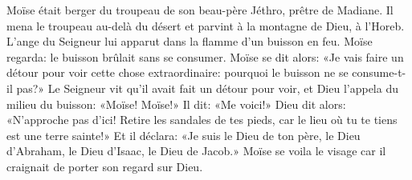 Moïse était berger du troupeau de son beau-père Jéthro, prêtre de Madiane.
Il mena le troupeau au-delà du désert
	et parvint à la montagne de Dieu, à l’Horeb.
L’ange du Seigneur lui apparut dans la flamme d’un buisson en feu.
	Moïse regarda: le buisson brûlait sans se consumer.
Moïse se dit alors:
	«Je vais faire un détour pour voir cette chose extraordinaire:
	pourquoi le buisson ne se consume-t-il pas?»
Le Seigneur vit qu’il avait fait un détour pour voir,
	et Dieu l’appela du milieu du buisson: «Moïse! Moïse!»
	Il dit: «Me voici!»
Dieu dit alors: «N’approche pas d’ici!
	Retire les sandales de tes pieds,
	car le lieu où tu te tiens est une terre sainte!»
Et il déclara: «Je suis le Dieu de ton père,
	le Dieu d’Abraham, le Dieu d’Isaac, le Dieu de Jacob.»
Moïse se voila le visage car il craignait de porter son regard sur Dieu.
